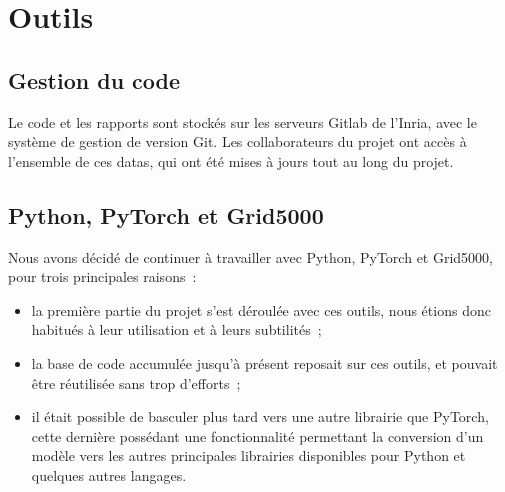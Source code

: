\section{Outils}
\subsection{Gestion du code}
Le code et les rapports sont stockés sur les serveurs Gitlab de l'Inria, avec le système de gestion de version Git. Les collaborateurs du projet ont accès à l'ensemble de ces \glspl{data}, qui ont été mises à jours tout au long du projet.

\subsection{Python, PyTorch et Grid5000}
Nous avons décidé de continuer à travailler avec Python, PyTorch et Grid5000, pour trois principales raisons~:
\begin{itemize}
	\item la première partie du projet s'est déroulée avec ces outils, nous étions donc habitués à leur utilisation et à leurs subtilités~;
	\item la base de code accumulée jusqu'à présent reposait sur ces outils, et pouvait être réutilisée sans trop d'efforts~;
	\item il était possible de basculer plus tard vers une autre librairie que  PyTorch, cette dernière possédant une fonctionnalité permettant la conversion d'un modèle vers les autres principales librairies disponibles pour Python et quelques autres langages.
\end{itemize}